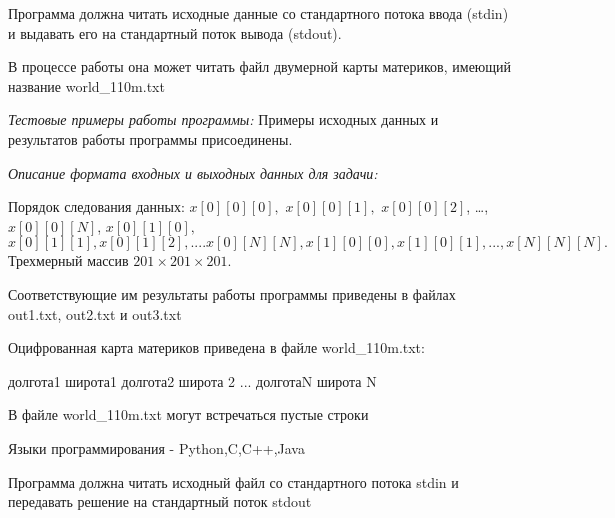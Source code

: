     Программа должна читать исходные данные со стандартного потока ввода (stdin) и выдавать его на стандартный поток вывода (stdout).
    
В процессе работы она может читать файл двумерной карты материков, имеющий название world\_110m.txt 

\textit{Тестовые примеры работы программы:}
	Примеры исходных данных и результатов работы программы присоединены.

\textit{Описание формата входных и выходных данных для задачи:}

Порядок следования данных: $x[0][0][0],$ $x[0][0][1],$ $x[0][0][2]$, \dots , $x[0][0][N]$, $x[0][1][0],$ \linebreak $x[0][1][1], x[0][1][2], .... x[0][N][N], x[1][0][0], x[1][0][1], ... , x[N][N][N].$ Трехмерный массив $201\times 201\times 201$.

Соответствующие им результаты работы программы приведены в файлах out1.txt, out2.txt и out3.txt

Оцифрованная карта материков приведена в файле world\_110m.txt:

долгота1 широта1
долгота2 широта 2
...
долготаN широта N

В файле world\_110m.txt могут встречаться пустые строки

Языки программирования - Python,C,C++,Java

Программа должна читать исходный файл со стандартного потока stdin и передавать решение на стандартный поток stdout

\explanationSection


